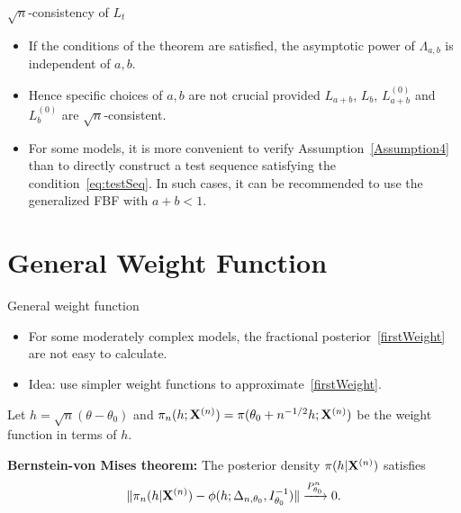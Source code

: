 \documentclass{beamer}
\theoremstyle{plain}
\theoremstyle{definition}
\theoremstyle{remark}
\begin{document}
\begin{frame}{$\sqrt{n}$-consistency of $L_t$}
    \begin{itemize}
        \item
If the conditions of the theorem are satisfied, the asymptotic power of $\Lambda_{a,b}$ is independent of $a,b$.
        \item
Hence specific choices of $a,b$ are not crucial provided $L_{a+b}$, $L_b$, $L^{(0)}_{a+b}$ and $L^{(0)}_b$ are $\sqrt{n}$-consistent.
        \item
For some models, it is more convenient to verify Assumption~\ref{Assumption4} than to directly construct a test sequence satisfying the condition~\eqref{eq:testSeq}.
In such cases, it can be recommended to use the generalized FBF with $a+b< 1$.
\end{itemize}
\end{frame}

\section{General Weight Function}

\begin{frame}{General weight function}
    \begin{itemize}
        \item
For some moderately complex models, the fractional posterior~\eqref{firstWeight} are not easy to calculate.
        \item
Idea: use simpler weight functions to approximate~\eqref{firstWeight}.
\end{itemize}
Let $h=\sqrt{n}(\theta-\theta_0)$ and $\pi_n(h;\mathbf{X}^{(n)})=\pi(\theta_0+n^{-1/2}h;\mathbf{X}^{(n)})$ be the weight function in terms of $h$.

\textbf{Bernstein-von Mises theorem:}
The posterior density $\pi(h|\mathbf{X}^{(n)})$ satisfies
$$
            \|\pi_n(h|\mathbf{X}^{(n)})-\phi(h;\Delta_{n,\theta_0},I_{\theta_0}^{-1})\|
            \xrightarrow{P_{\theta_0}^n}0.
$$


\end{frame}
\end{document}
